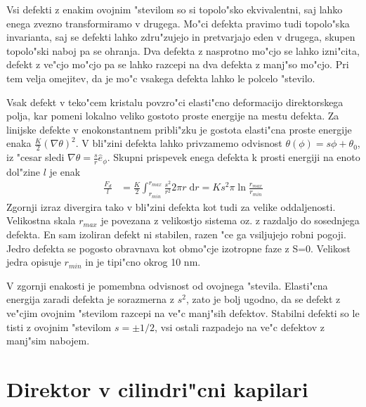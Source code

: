\documentclass[12pt,twoside,openright,final,a4paper]{report}
\newcommand{\dd}{\ensuremath{\;\mathrm{d}}}
\begin{document}
Vsi defekti z enakim ovojnim "stevilom so si topolo"sko ekvivalentni, saj lahko enega zvezno transformiramo v drugega. 
Mo"ci defekta pravimo tudi topolo"ska invarianta, saj se defekti lahko zdru"zujejo in pretvarjajo eden v drugega, skupen topolo"ski naboj pa se ohranja. 
Dva defekta z nasprotno mo"cjo se lahko izni"cita, defekt z ve"cjo mo"cjo pa se lahko razcepi na dva defekta z manj"so mo"cjo. 
Pri tem velja omejitev, da je mo"c vsakega defekta lahko le polcelo "stevilo. 

Vsak defekt v teko"cem kristalu povzro"ci elasti"cno deformacijo direktorskega polja, kar pomeni lokalno veliko gostoto proste energije na mestu defekta. 
Za linijske defekte v enokonstantnem pribli"zku je gostota elasti"cna proste energije enaka $\frac{K}{2}(\nabla \theta)^2$. 
V bli"zini defekta lahko privzamemo odvisnost $\theta(\phi) = s \phi + \theta_0$, iz "cesar sledi $\nabla\theta = \frac{s}{r}\hat e_\phi$. 
Skupni prispevek enega defekta k prosti energiji na enoto dol"zine $l$ je enak \cite{degennes}
\begin{align}
 \frac{F_d}{l} &= \frac{K}{2} \int_{r_{min}}^{r_{max}} \frac{s^2}{r^2} 2\pi r \dd r = K s^2 \pi \ln{\frac{r_{max}}{r_{min}}}
\end{align}
Zgornji izraz divergira tako v bli"zini defekta kot tudi za velike oddaljenosti. 
Velikostna skala $r_{max}$ je povezana z velikostjo sistema oz. z razdaljo do sosednjega defekta. 
En sam izoliran defekt ni stabilen, razen "ce ga vsiljujejo robni pogoji. 
Jedro defekta se pogosto obravnava kot obmo"cje izotropne faze z S=0.
Velikost jedra opisuje $r_{min}$ in je tipi"cno okrog 10 nm. 

V zgornji enakosti je pomembna odvisnost od ovojnega "stevila. 
Elasti"cna energija zaradi defekta je sorazmerna z $s^2$, zato je bolj ugodno, da se defekt z ve"cjim ovojnim "stevilom razcepi na ve"c manj"sih defektov. 
Stabilni defekti so le tisti z ovojnim "stevilom $s=\pm1/2$, vsi ostali razpadejo na ve"c defektov z manj"sim nabojem. 

\section{Direktor v cilindri"cni kapilari}
\end{document}
